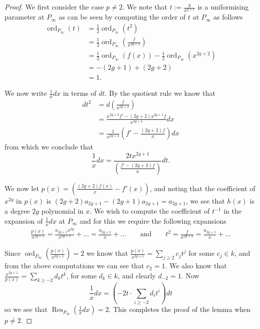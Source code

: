\documentclass[draft, 11pt]{article} %
\theoremstyle{plain}
\theoremstyle{remark}
\DeclareMathOperator{\res}{Res}
\DeclareMathOperator{\ord}{ord}
\begin{document}
\begin{proof}

We first consider the case $p\neq 2$.
We note that $t:= \frac{y}{x^{g+1}}$ is a uniformising parameter at $P_\infty$ as can be seen by computing the order of $t$ at $P_\infty$ as follows
\begin{align*}
\ord_{P_\infty}(t) & =  \frac{1}{2}\ord_{P_\infty}(t^2) \\
  & =  \frac{1}{2}\ord_{P_\infty}\left( \frac{f}{x^{2g+2}} \right) \\
& =  \frac{1}{2}\ord_{P_\infty}(f(x)) - \frac{1}{2}\ord_{P_\infty}(x^{2g+2})\\
& =  -(2g+1) + (2g+2) \\
& =  1.
\end{align*}

We now write $\frac{1}{x}dx$ in terms of $dt$.
By the quotient rule we know that
\begin{align*}
dt^2 & =  d \left( \frac{f}{x^{2g+2}} \right) \\
& =  \frac{x^{2g+2}f' - (2g+2)x^{2g+1}f}{x^{4g+4}} dx \\
& =  \frac{1}{x^{2g+2}} \left( f' - \frac{(2g+2)f}{x} \right) dx
\end{align*}
from which we conclude that
\[
\frac{1}{x}dx = \frac{2tx^{2g+1}}{\left(\frac{f' - (2g+2)f}{x} \right)} dt.
\]


We now let $p(x) = \left(\frac{(2g+2)f(x)}{x} - f'(x)\right)$, and noting that the coefficient of $x^{2g}$ in $p(x)$ is $(2g+2)a_{2g+1} - (2g+1)a_{2g+1} = a_{2g+1}$, we see that $h(x)$ is a degree $2g$ polynomial in $x$.
We wish to compute the coefficient of $t^{-1}$ in the expansion of $\frac{1}{x}dx$ at $P_\infty$ and for this we require the following expansions
\begin{align*}
\frac{p(x)}{x^{2g+1}} = \frac{a_{2g+1}x^{2g}}{x^{2g+1}} + \ldots = \frac{a_{2g+1}}{x} + \ldots \qquad \text{and} \qquad t^2 = \frac{f}{x^{2g+2} } = \frac{a_{2g+1}}{x} + \ldots
\end{align*}

Since $\ord_{P_\infty}\left(\frac{p(x)}{x^{2g+1}}\right) = 2$ we know that $\frac{p(x)}{x^{2g+1}} = \sum_{j\geq 2} c_j t^j$ for some $c_j\in k$, and from the above computations we can see that $c_2 = 1$.
We also know that $\frac{x^{2g+1}}{p(x)} = \sum_{k\geq -2} d_kt^k$, for some $d_k\in k$, and clearly $d_{-2} = 1$.
Now
\[
\frac{1}{x}dx = \left( -2t \cdot \sum_{i\geq -2} d_it^i\right) dt 
\]
so we see that $\res_{P_\infty}\left( \frac{1}{x} dx\right) = 2$.
This completes the proof of the lemma when $p\neq 2$.


\end{proof}
\end{document}
